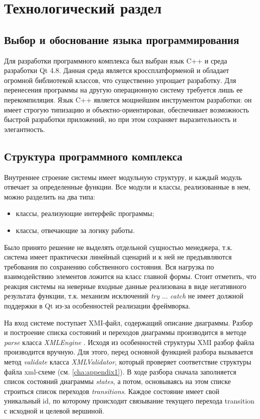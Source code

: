 \chapter{Технологический раздел}

\section{Выбор и обоснование языка программирования}

Для разработки программного комплекса был выбран язык C++ и среда разработки Qt 4.8. Данная среда является кроссплатформеной и обладает огромной библиотекой классов, что существенно упрощает разработку. Для перенесения программы на другую операционную систему требуется лишь ее перекомпиляция. Язык C++ является мощнейшим инструментом разработки: он имеет строгую типизацию и объектно-ориентирован, обеспечивает возможность быстрой разработки приложений, но при этом сохраняет выразительность и элегантность.

\section{Структура программного комплекса}

Внутреннее строение системы имеет модульную структуру, и каждый модуль отвечает за определенные функции. Все модули и классы, реализованные в нем, можно разделить на два типа:
\begin{itemize}
\item классы, реализующие интерфейс программы;
\item классы, отвечающие за логику работы.
\end{itemize}

Было принято решение не выделять отдельной сущностью менеджера, т.к. система имеет практически линейный сценарий и к ней не предъявляются требования по сохранению собственного состояния. Вся нагрузка по взаимодействию элементов ложится на класс главной формы. Стоит отметить, что реакция системы на неверные входные данные реализована в виде негативного результата функции, т.к. механизм исключений \textit{try} ... \textit{catch} не имеет должной поддержки в Qt из-за особенностей реализации фреймворка.

На вход системе поступает XMI-файл, содержащий описание диаграммы. Разбор и построение списка состояний и переходов диаграммы производится в методе \textit{parse} класса \textit{XMLEngine} . Исходя из особенностей структуры XMI разбор файла производится вручную. Для этого, перед основной функцией разбора вызывается метод \textit{validate} класса \textit{XMLValidator}, который проверяет соответствие структуры файла xml-схеме (см. \ref{cha:appendix1}). В ходе разбора сначала заполняется список состояний диаграммы \textit{states}, а потом, основываясь на этом списке строиться список переходов \textit{transitions}. Каждое состояние имеет свой уникальный id, по которому происходит связывание текущего перехода transition с исходной и целевой вершиной.

